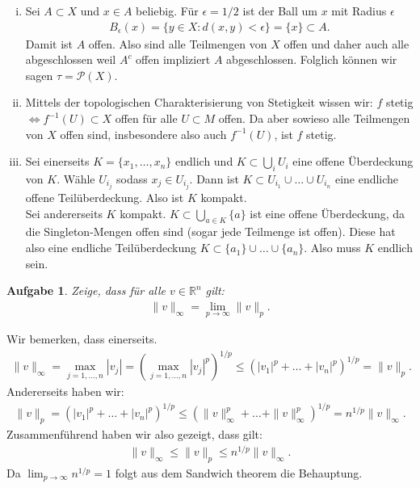 \documentclass[a4paper, 20]{exam}
\newtheorem{ex}{Aufgabe}
\begin{document}
\begin{solution}
\begin{enumerate}[i)]
\item Sei $A \subset X$ und $x \in A$ beliebig. Für $\epsilon = 1/2$ ist der Ball um $x$ mit Radius $\epsilon$ 
\begin{align*}
B_\epsilon(x)= \{ y \in X : d(x,y) < \epsilon\} = \{x\} \subset A.
\end{align*}
Damit ist $A$ offen. Also sind alle Teilmengen von $X$ offen und daher auch alle abgeschlossen weil $A^c$ offen impliziert $A$ abgeschlossen. Folglich können wir sagen $\tau = \mathcal{P}(X)$. 
\item Mittels der topologischen Charakterisierung von Stetigkeit wissen wir: $f$ stetig $\iff f^{-1}(U) \subset X$ offen für alle $U \subset M$ offen. Da aber sowieso alle Teilmengen von $X$ offen sind, insbesondere also auch $f^{-1}(U)$, ist $f$ stetig.
\item Sei einerseits $K=\{x_1, \dots , x_n\}$ endlich und $K \subset \bigcup_i U_i$ eine offene Überdeckung von $K$. Wähle $U_{i_j}$ sodass $x_j \in U_{i_j}$. Dann ist $K \subset U_{i_1} \cup \dots \cup U_{i_n}$ eine endliche offene Teilüberdeckung. Also ist $K$ kompakt.  \\
Sei andererseits $K$ kompakt. $K \subset \bigcup_{a \in K} \{a\}$ ist eine offene Überdeckung, da die Singleton-Mengen offen sind (sogar jede Teilmenge ist offen). Diese hat also eine endliche Teilüberdeckung $K \subset \{a_1 \} \cup \dots \cup \{a_n\}$. Also muss $K$ endlich sein. 
\end{enumerate}
\end{solution}

\begin{ex} Zeige, dass für alle $v \in \mathbb{R}^n$ gilt:
\begin{align*}
\|v\|_\infty = \lim_{p \to \infty} \|v\|_p.
\end{align*}
\end{ex}

\begin{solution} Wir bemerken, dass einerseits.
\begin{align*}
\|v\|_\infty = \max_{j=1, \dots ,n} |v_j| = \left( \max_{j=1,  \dots ,n} |v_j|^p \right)^{1/p} \leq \left( |v_1|^p + \dots + |v_n|^p \right)^{1/p} = \|v\|_p.
\end{align*}
Andererseits haben wir:
\begin{align*}
\|v\|_p = ( |v_1|^p + \dots + |v_n|^p)^{1/p} \leq ( \|v\|_\infty^p + \dots + \|v\|_\infty^p)^{1/p} = n^{1/p} \|v\|_\infty.
\end{align*}
Zusammenführend haben wir also gezeigt, dass gilt:
\begin{align*}
\|v\|_\infty \leq \|v\|_p \leq n^{1/p} \|v\|_\infty.
\end{align*}
Da $\lim_{p \to \infty} n^{1/p}=1$ folgt aus dem Sandwich theorem die Behauptung. 
\end{solution}
\end{document}
